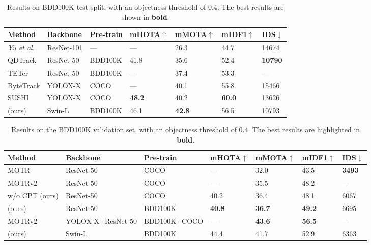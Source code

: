 \begin{table*}[t]
\centering \footnotesize
\begin{tabular}{lllllll}
\toprule
Method                              & Backbone  & Pre-train & mHOTA$\uparrow$ & mMOTA$\uparrow$ & mIDF1$\uparrow$ & IDS$\downarrow$ \\ \midrule
\textit{Yu et al.} \cite{bdd100k}   & ResNet-101 & ---        & ---    & 26.3     & 44.7      & 14674 \\ 
QDTrack \cite{cvpr_qdtrack}              & ResNet-50 & BDD100K   & 41.8   & 35.6     & 52.4      & \textbf{10790} \\ 
TETer \cite{li2022TETer_tracking}   & ResNet-50 & BDD100K   & ---    & 37.4     & 53.3      & --- \\
ByteTrack \cite{ByteTrack}          & YOLOX-X   & COCO      & ---    & 40.1     & 55.8      & 15466 \\
SUSHI \cite{Cetintas_2023_CVPR}     & YOLOX-X   & COCO      & \textbf{48.2}    & 40.2     & \textbf{60.0}      & 13626 \\
\textbf{\ourmodelname{}}  (ours)              & Swin-L    & BDD100K   & 46.1 & \textbf{42.8} & 56.5     & 10793   \\
\bottomrule
\end{tabular}
\caption{Results on BDD100K test split, with an objectness threshold of 0.4. The best results are shown in \textbf{bold}.}
\label{tab:metrics-on-BDD100K-test}
\vspace{-2.0em}
\end{table*}


\begin{table*}[t]
\centering \footnotesize
\begin{tabular}{lllllll}
\toprule
Method                                       & Backbone  & Pre-train & mHOTA$\uparrow$ & mMOTA$\uparrow$ & mIDF1$\uparrow$ & IDS$\downarrow$ \\ \midrule               
MOTR \cite{zeng2022motr}        & ResNet-50 & COCO      & ---             & 32.0            & 43.5            & \textbf{3493}   \\
MOTRv2 \cite{Zhang_2023_CVPR}   & ResNet-50 & COCO      & ---             & 35.5            & 48.2            & ---  \\
\textbf{\ourmodelname{}} w/o CPT (ours)  & ResNet-50 & COCO      & 40.2            & 36.4            & 48.1            & 6067  \\ 
\textbf{\ourmodelname{}} (ours)          & ResNet-50 & BDD100K & \textbf{40.8} & \textbf{36.7} & \textbf{49.2} &  6695 \\ \midrule 
MOTRv2 \cite{Zhang_2023_CVPR}   & YOLOX-X+ResNet-50 & BDD100K+COCO & ---       & \textbf{43.6}     & \textbf{56.5}            & ---  \\ 
\textbf{\ourmodelname{}} (ours)          & Swin-L & BDD100K   & 44.4   & 41.7   & 52.9   & 6363            \\ 
\bottomrule
\end{tabular}
\caption{Results on the BDD100K validation set, with an objectness threshold of 0.4. The best results are highlighted in \textbf{bold}. } 
\label{tab:metrics-on-BDD100K-val}
\vspace{-1.4em}
\end{table*}

